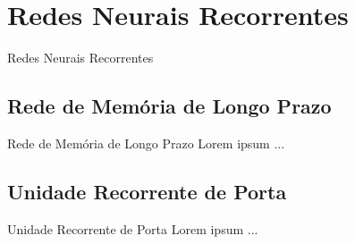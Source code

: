 \section{Redes Neurais Recorrentes}
\label{s.rnn}

\begin{frame}{Redes Neurais Recorrentes}
\end{frame}

\subsection{Rede de Memória de Longo Prazo}
\label{ss.lstm}

\begin{frame}{Rede de Memória de Longo Prazo}
	Lorem ipsum ...
\end{frame}

\subsection{Unidade Recorrente de Porta}
\label{ss.gru}

\begin{frame}{Unidade Recorrente de Porta}
	Lorem ipsum ...
\end{frame}